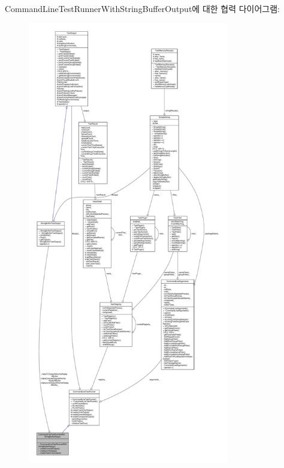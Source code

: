 Command\+Line\+Test\+Runner\+With\+String\+Buffer\+Output에 대한 협력 다이어그램\+:
\nopagebreak
\begin{figure}[H]
\begin{center}
\leavevmode
\includegraphics[height=550pt]{class_command_line_test_runner_with_string_buffer_output__coll__graph}
\end{center}
\end{figure}
